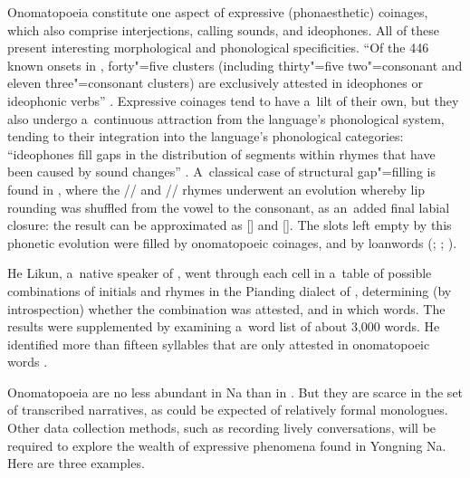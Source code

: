 
			Onomatopoeia constitute one aspect of expressive (phonaesthetic) coinages, {\linebreak}which also comprise interjections,
			calling sounds, and ideophones. All of these present interesting morphological and phonological
			specificities. “Of the 446 known onsets in , forty"=five clusters (including thirty"=five
			two"=consonant and eleven three"=consonant clusters) are exclusively attested in ideophones or
			ideophonic verbs” \citep[264]{jacques2013c}. Expressive coinages tend to have a~lilt of their own, but they
			also undergo a~continuous attraction from the language's phonological system, tending to
			their integration into the language's phonological categories: “ideophones fill gaps in the distribution of segments
			within rhymes that have been caused by sound changes” \citep[267]{jacques2013c}. A~classical case of structural gap"=filling is found in
			, where the // and //
			rhymes underwent an evolution whereby lip rounding was shuffled from the vowel to the consonant, as an~added final
			labial closure: the result can be approximated as [] and []. The slots left empty by this phonetic evolution were filled by onomatopoeic coinages, and by loanwords (\citealt{haudricourt1952b}; \citealt[21]{henderson1985}; \citealt[143]{michaud2004a}). 
			
			He
			Likun, a~native speaker of , went through each cell in a~table of possible combinations of
			initials and rhymes in the Pianding dialect of , determining (by introspection) whether the
			combination was attested, and in which words. The results were supplemented by examining a~word list
			of about 3,000 words. He identified more than fifteen syllables that are only attested in
			onomatopoeic words \citep{michaudetal2015c}. 			
			
			Onomatopoeia are no less abundant in Na than in . But they are scarce in
			the set of transcribed narratives, as could be expected of relatively formal monologues. Other data
			collection methods, such as recording lively conversations, will be required to explore the wealth
			of expressive phenomena found in Yongning Na. Here are three examples.
			
